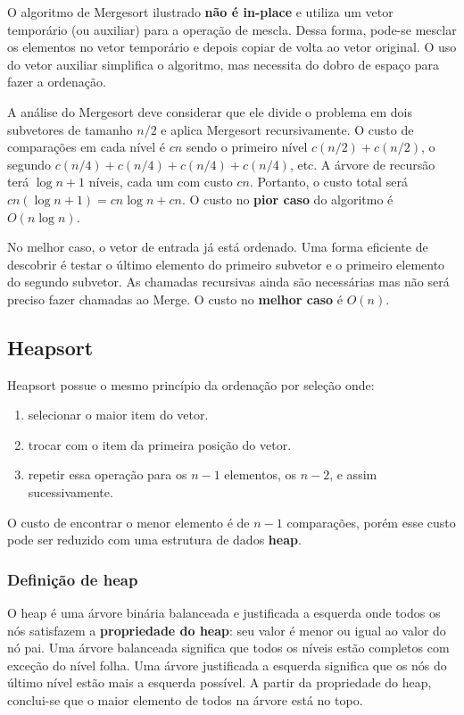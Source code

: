 O algoritmo de Mergesort ilustrado {\bf não é in-place} e utiliza um vetor
temporário (ou auxiliar) para a operação de mescla.
Dessa forma, pode-se mesclar os elementos no vetor temporário e depois copiar
de volta ao vetor original.
O uso do vetor auxiliar simplifica o algoritmo, mas necessita do dobro de
espaço para fazer a ordenação.

A análise do Mergesort deve considerar que ele divide o problema em dois
subvetores de tamanho $n/2$ e aplica Mergesort recursivamente.
O custo de comparações em cada nível é $cn$ sendo o primeiro nível
$c(n/2)+c(n/2)$, o segundo $c(n/4)+c(n/4)+c(n/4)+c(n/4)$, etc.
A árvore de recursão terá $\log n + 1$ níveis, cada um com custo $cn$.
Portanto, o custo total será $cn(\log n + 1) = cn \log n + cn$.
O custo no {\bf pior caso} do algoritmo é $O(n \log n)$.

No melhor caso, o vetor de entrada já está ordenado. 
Uma forma eficiente de descobrir é testar o último elemento do primeiro subvetor
e o primeiro elemento do segundo subvetor.
As chamadas recursivas ainda são necessárias mas não será preciso fazer chamadas
ao Merge.
O custo no {\bf melhor caso} é $O(n)$.

\subsection{Heapsort}

Heapsort possue o mesmo princípio da ordenação por seleção onde:
\begin{enumerate}
\item selecionar o maior item do vetor.
\item trocar com o item da primeira posição do vetor.
\item repetir essa operação para os $n-1$ elementos, os $n-2$, e assim sucessivamente.
\end{enumerate}
O custo de encontrar o menor elemento é de $n-1$ comparações, porém esse custo pode ser reduzido
com uma estrutura de dados {\bf heap}.

\subsubsection*{Definição de heap}

O heap é uma árvore binária balanceada e justificada a esquerda onde todos os
nós satisfazem a {\bf propriedade do heap}: seu valor é menor ou igual ao valor
do nó pai.
Uma árvore balanceada significa que todos os níveis estão completos com exceção
do nível folha.
Uma árvore justificada a esquerda significa que os nós do último nível
estão mais a esquerda possível.
A partir da propriedade do heap, conclui-se que o maior elemento de todos
na árvore está no topo.

